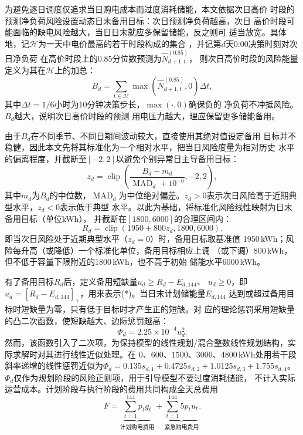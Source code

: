 为避免逐日调度仅追求当日购电成本而过度消耗储能，本文依据次日高价
时段的预测净负荷风险设置动态日末备用目标：次日预测净负荷越高，次日
高价时段可能面临的缺电风险越大，当日日末就应多保留储能，反之则可
适当放宽。具体地，记$\mathcal H$为一天中电价最高的若干时段构成的集合
，并记第$d$天0:00决策时刻对次日净负荷
在高价时段上的$0.85$分位数预测为$\widehat N_{d+1,t}^{(0.85)}$，
则次日高价时段的风险能量定义为其在$\mathcal H$上的加总：
\begin{equation}
B_d=\sum_{t\in\mathcal H}\max\left(\widehat N_{d+1,t}^{(0.85)},0\right)\Delta t,
\end{equation}
其中$\Delta t=1/6$小时为10分钟决策步长，$\max(\cdot,0)$确保负的
净负荷不冲抵风险。$B_d$越大，说明次日高价时段的预测
用电压力越大，理应保留更多储能备用。

由于$B_d$在不同季节、不同日期间波动较大，直接使用其绝对值设定备用
目标并不稳健，因此本文先将其标准化为一个相对水平，把当日风险度量为相对历史
水平的偏离程度，并截断至$[-2,2]$以避免个别异常日主导备用目标：
\begin{equation}
z_d=\operatorname{clip}\left(
\frac{B_d-m_d}{\operatorname{MAD}_d+10^{-6}},-2,2\right),
\end{equation}
其中$m_d$为$B_d$的中位数，$\operatorname{MAD}_d$为中位绝对偏差。$z_d>0$表示次日风险高于近期典型水平，$z_d<0$表示低于典型
水平。以此为基础，将标准化风险线性映射为日末备用目标（单位kWh），
并截断在$[1800,6000]$的合理区间内：
\begin{equation}
R_d=\operatorname{clip}(1950+800z_d,1800,6000).
\end{equation}
即当次日风险处于近期典型水平（$z_d=0$）时，备用目标取基准值
1950\,kWh；风险每升高（或降低）一个标准化单位，备用目标相应上调
（或下调）800\,kWh，但不低于容量下限附近的1800\,kWh，也不高于初始
储能水平6000\,kWh。

有了备用目标$R_d$后，定义备用短缺量$u_d\ge R_d-E_{d,144}$、
$u_d\ge0$，即$u_d=[R_d-E_{d,144}]_+$，用来表示(*)。当日末计划储能量$E_{d,144}$
达到或超过备用目标时短缺量为零，只有低于目标时才产生正的短缺。对
应的理论惩罚采用短缺量的凸二次函数，使短缺越大、边际惩罚越高：
\begin{equation}
\Phi_d=2.25\times10^{-4}u_d^2.
\end{equation}
然而，该函数引入了二次项，为保持模型的线性规划/混合整数线性规划结构，实际求解时对其进行线性近似处理。在
$0$、$600$、$1500$、$3000$、$4800$\,kWh处用若干段斜率递增的线性惩罚近似为$\Phi_d=0.135s_{d,1}+0.4725s_{d,2}+1.0125s_{d,3}+1.755s_{d,4}$。
$\Phi_d$仅作为规划阶段的风险正则项，用于引导模型不要过度消耗储能，
不计入实际运营成本。计划阶段与执行阶段的费用共同构成全天总费用
\begin{equation}
F=\underbrace{\sum_{t=1}^{144}p_tg_t}_{\text{计划购电费用}}+\underbrace{\sum_{t=1}^{144}5p_tu_t}_{\text{紧急购电费用}}.
\end{equation}

